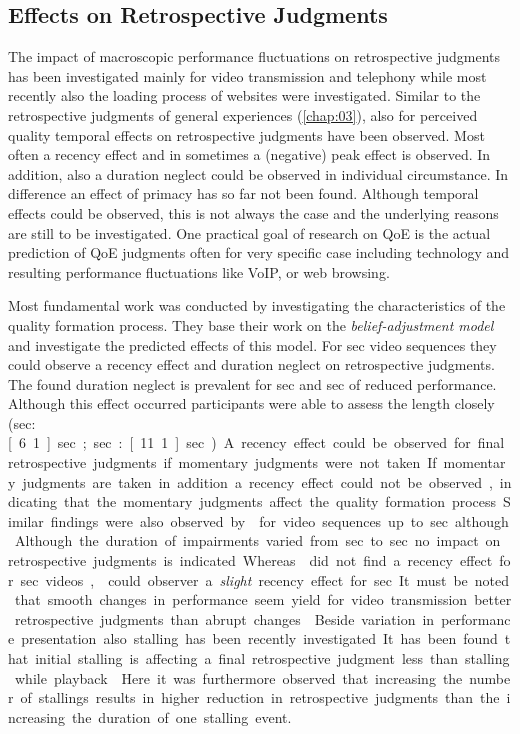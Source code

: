 \subsection{Effects on Retrospective Judgments}
The impact of macroscopic performance fluctuations on retrospective judgments has been investigated mainly for video transmission and telephony while most recently also the loading process of websites were investigated.
Similar to the retrospective judgments of general experiences (\autoref{chap:03}), also for perceived quality temporal effects on retrospective judgments have been observed.
Most often a recency effect and in sometimes a (negative) peak effect is observed.
In addition, also a duration neglect could be observed in individual circumstance.
In difference an effect of primacy has so far not been found.
Although temporal effects could be observed, this is not always the case and the underlying reasons are still to be investigated.
One practical goal of research on \ac{QoE} is the actual prediction of \ac{QoE} judgments often for very specific case including technology and resulting performance fluctuations like \ac{VoIP}, or web browsing.

Most fundamental work was conducted by \citet{hands_recency_2001} investigating the characteristics of the quality formation process.
They base their work on the \emph{belief-adjustment model} \citep{hogarth_order_1992} and investigate the predicted effects of this model.
For \unit[30]{sec} video sequences they could observe a recency effect and duration neglect on retrospective judgments.
The found duration neglect is prevalent for \unit[5]{sec} and \unit[10]{sec} of reduced performance.
Although this effect occurred participants were able to assess the length closely (\unit[5]{sec}: \unit[6.1]{sec}; \unit[10]{sec}: \unit[11.1]{sec}).
A recency effect could be observed for final retrospective judgments if momentary judgments were not taken.
If momentary judgments are taken in addition a recency effect could not be observed, indicating that the momentary judgments affect the quality formation process.
Similar findings were also observed by \citet{hamberg_time-varying_1999} for video sequences up to \unit[180]{sec} although.
Although the duration of impairments varied from \unit[2]{sec} to \unit[10]{sec} no impact on retrospective judgments is indicated.
Whereas \citet{ninassi_considering_2009} did not find a recency effect for \unit[8]{sec} videos, \citet{garcia_accuracy_2015} could observer a \emph{slight} recency effect for \unit[30]{sec}.
It must be noted that smooth changes in performance seem yield for video transmission better retrospective judgments than abrupt changes \citep[\eg,][]{egger_impact_2014}.
Beside variation in performance presentation also stalling has been recently investigated.
It has been found that initial stalling is affecting a final retrospective judgment less than stalling while playback \citep[\cf,][]{hossfeld_pippi_2013}.
Here it was furthermore observed that increasing the number of stallings results in higher reduction in retrospective judgments than the increasing the duration of one stalling event.

